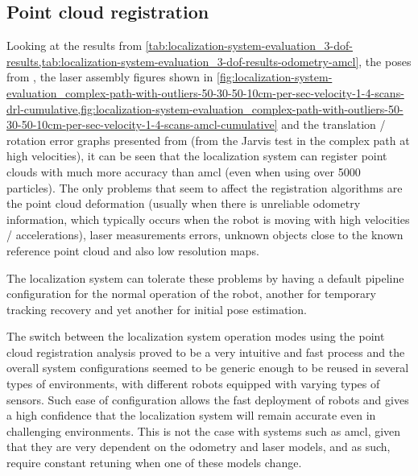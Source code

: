 \subsection{Point cloud registration}

Looking at the results from \cref{tab:localization-system-evaluation_3-dof-results,tab:localization-system-evaluation_3-dof-results-odometry-amcl}, the poses from , the laser assembly figures shown in \cref{fig:localization-system-evaluation_complex-path-with-outliers-50-30-50-10cm-per-sec-velocity-1-4-scans-drl-cumulative,fig:localization-system-evaluation_complex-path-with-outliers-50-30-50-10cm-per-sec-velocity-1-4-scans-amcl-cumulative} and the translation / rotation error graphs presented from  (from the Jarvis test in the complex path at high velocities), it can be seen that the localization system can register point clouds with much more accuracy than \gls{amcl} (even when using over 5000 particles). The only problems that seem to affect the registration algorithms are the point cloud deformation (usually when there is unreliable odometry information, which typically occurs when the robot is moving with high velocities / accelerations), laser measurements errors, unknown objects close to the known reference point cloud and also low resolution maps.

The localization system can tolerate these problems by having a default pipeline configuration for the normal operation of the robot, another for temporary tracking recovery and yet another for initial pose estimation.

The switch between the localization system operation modes using the point cloud registration analysis proved to be a very intuitive and fast process and the overall system configurations seemed to be generic enough to be reused in several types of environments, with different robots equipped with varying types of sensors. Such ease of configuration allows the fast deployment of robots and gives a high confidence that the localization system will remain accurate even in challenging environments. This is not the case with systems such as \gls{amcl}, given that they are very dependent on the odometry and laser models, and as such, require constant retuning when one of these models change.

